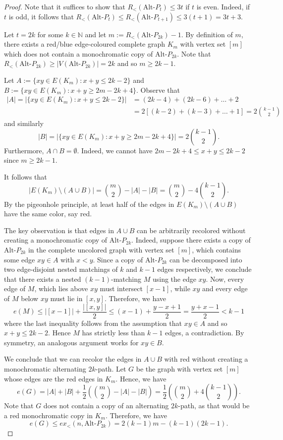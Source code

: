 \documentclass[11pt]{article}
\theoremstyle{definition}
\begin{document}
\begin{proof}
    Note that it suffices to show that $R_<(\text{Alt-}P_{t})\le3t$ if $t$ is even.
    Indeed, if $t$ is odd, it follows that $R_<(\text{Alt-}P_{t})\le R_<(\text{Alt-}P_{t+1})\le3(t+1)=3t+3$.

    Let $t=2k$ for some $k\in\mathbb N$ and let $m:=R_<(\text{Alt-}P_{2k})-1$.
    By definition of $m$, there exists a red/blue edge-coloured complete graph $K_m$ with vertex set $[m]$ which does not contain a monochromatic copy of $\text{Alt-}P_{2k}$.
    Note that $R_<(\text{Alt-}P_{2k})\ge|V(\text{Alt-}P_{2k})|=2k$ and so $m\ge2k-1$.

    Let $A:=\{xy\in E(K_m):x+y\le 2k-2\}$ and $B:=\{xy\in E(K_m):x+y\ge 2m-2k+4\}$.
    Observe that 
    \begin{align*}
    |A|=|\{xy\in E(K_m):x+y\le 2k-2\}| &=(2k-4)+(2k-6)+\dots+2\\
    & =2[(k-2)+(k-3)+\dots+1]=2\binom{k-1}{2}
    \end{align*}
    and similarly
    $$|B|=|\{xy\in E(K_m):x+y\ge 2m-2k+4\}|=2\binom{k-1}{2}.$$
    Furthermore, $A\cap B=\emptyset$.
    Indeed, we cannot have $2m-2k+4\le x+y\le 2k-2$ since $m\ge2k-1$.

    It follows that
    $$|E(K_m)\setminus(A\cup B)|=\binom{m}{2}-|A|-|B|=\binom{m}{2}-4\binom{k-1}{2}.$$
    By the pigeonhole principle, at least half of the edges in $E(K_m)\setminus(A\cup B)$ have the same color, say red.

    The key observation is that edges in $A\cup B$ can be arbitrarily recolored without creating a monochromatic copy of $\text{Alt-}P_{2k}$.
    Indeed, suppose there exists a copy of $\text{Alt-}P_{2k}$ in the complete uncolored graph with vertex set $[m]$, which contains some edge $xy\in A$ with $x<y$.
    Since a copy of $\text{Alt-}P_{2k}$ can be decomposed into two edge-disjoint nested matchings of $k$ and $k-1$ edges respectively, we conclude that there exists a nested $(k-1)$-matching $M$ using the edge $xy$.
    Now, every edge of $M$, which lies above $xy$ must intersect $[x-1]$, while $xy$ and every edge of $M$ below $xy$ must lie in $[x,y]$.
    Therefore, we have
    $$e(M)\le|[x-1]|+\frac{|[x,y]|}{2}\le(x-1)+\frac{y-x+1}{2}=\frac{y+x-1}{2}<k-1$$
    where the last inequality follows from the assumption that $xy\in A$ and so $x+y\le 2k-2$.
    Hence $M$ has strictly less than $k-1$ edges, a contradiction.
    By symmetry, an analogous argument works for $xy\in B$.

    We conclude that we can recolor the edges in $A\cup B$ with red without creating a monochromatic alternating $2k$-path.
    Let $G$ be the graph with vertex set $[m]$ whose edges are the red edges in $K_m$.
    Hence, we have
    $$e(G)=|A|+|B|+\frac{1}{2}\left(\binom{m}{2}-|A|-|B|\right)=\frac{1}{2}\left(\binom{m}{2}+4\binom{k-1}{2}\right).$$
    Note that $G$ does not contain a copy of an alternating $2k$-path, as that would be a red monochromatic copy in $K_m$.
    Therefore, we have
    $$e(G)\le ex_<(n,\text{Alt-}P_{2k})=2(k-1)m-(k-1)(2k-1).$$


\end{proof}
\end{document}

